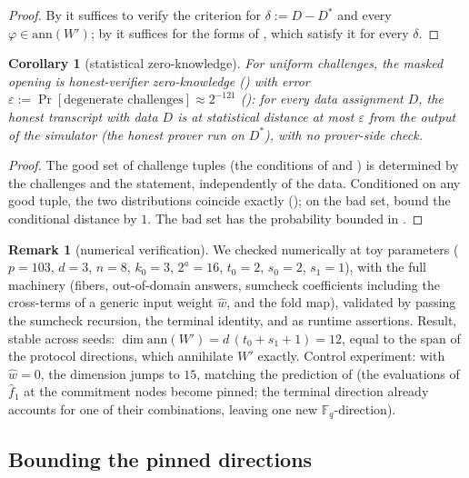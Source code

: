 \documentclass{article}
\newcommand{\Fq}{\mathbb{F}_q}
\newcommand{\extdeg}{d}
\newtheorem{corollary}[theorem]{Corollary}
\theoremstyle{definition}
\newtheorem{remark}[theorem]{Remark}
\begin{document}
\begin{proof}
By  it suffices to verify the criterion for $\delta := D - D^*$ and every $\varphi \in \mathrm{ann}(W')$; by  it suffices for the forms of , which satisfy it for every $\delta$.
\end{proof}

\begin{corollary}[statistical zero-knowledge]\label{cor:statzk}
For uniform challenges, the masked opening is honest-verifier zero-knowledge () with error $\varepsilon := \Pr[\text{degenerate challenges}] \approx 2^{-121}$ (): for every data assignment $D$, the honest transcript with data $D$ is at statistical distance at most $\varepsilon$ from the output of the simulator (the honest prover run on $D^*$), with no prover-side check.
\end{corollary}

\begin{proof}
The good set of challenge tuples (the conditions of  and ) is determined by the challenges and the statement, independently of the data. Conditioned on any good tuple, the two distributions coincide exactly (); on the bad set, bound the conditional distance by $1$. The bad set has the probability bounded in .
\end{proof}

\begin{remark}[numerical verification]
We checked  numerically at toy parameters ($p = 103$, $\extdeg = 3$, $n = 8$, $k_0 = 3$, $2^a = 16$, $t_0 = 2$, $s_0 = 2$, $s_1 = 1$), with the full machinery (fibers, out-of-domain answers, sumcheck coefficients including the cross-terms of a generic input weight $\hat{w}$, and the fold map), validated by passing the sumcheck recursion, the terminal identity, and  as runtime assertions. Result, stable across seeds: $\dim \mathrm{ann}(W') = \extdeg\,(t_0 + s_1 + 1) = 12$, equal to the span of the protocol directions, which annihilate $W'$ exactly. Control experiment: with $\hat{w} = 0$, the dimension jumps to $15$, matching the prediction of  (the evaluations of $\hat{f}_1$ at the commitment nodes become pinned; the terminal direction already accounts for one of their combinations, leaving one new $\Fq$-direction).
\end{remark}

\subsection{Bounding the pinned directions}\label{sec:pinbound}
\end{document}
